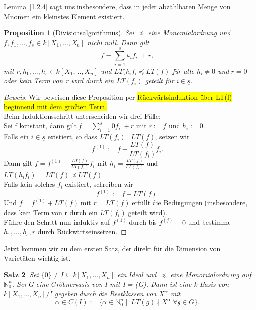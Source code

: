 \documentclass{article}
\newtheorem{satz}{Satz}
\newtheorem{proposition}[satz]{Proposition}
\newcommand*{\R}{k[X_{1},\ldots,X_{n}]}
\begin{document}
	Lemma~\ref{1.2.4} sagt uns insbesondere, dass in jeder abzählbaren Menge von Mnomen ein
	kleinstes Element existiert.
	

	\begin{proposition}[Divisionsalgorithmus] \label{1.2.5}
	Sei \(\preceq\) eine Monomialordnung und \(f, f_{1}, \ldots, f_{s} \in \R\) nicht null. Dann
	gilt \begin{displaymath} f = \sum_{i=1}^{s} h_{i}f_{i}\; + r, \end{displaymath} mit
	\(r, h_{1}, \ldots, h_{s} \in \R\) und \(LT(h_{i}f_{i} \preceq LT(f)\) für alle \(h_{i} \neq 0
	\) und \(r = 0\) oder kein Term von r wird durch ein \(LT(f_{i})\) geteilt für \(i \in
	\underline{s}\).
	\end{proposition}

	\begin{proof}[Beweis]
	Wir beweisen diese Proposition per \colorbox{yellow}{Rückwärtsinduktion über LT(f) beginnend mit dem größten Term.} \\
	Beim Induktionsschritt unterscheiden wir drei Fälle:\\
	Sei f konstant, dann gilt \(f = \sum_{i=1}^{s} 0f_{i}\; + r\) mit \(r := f\) und \(h_{i} := 0\). \\
	Falls ein \(i \in \underline{s}\) existiert, so dass \(LT(f_{i})\;| \; LT(f)\), setzen wir
	\begin{displaymath} f^{(1)} := f - \frac{LT(f)}{LT(f_{i})}f_{i}.\end{displaymath} Dann gilt
	\( f = f^{(1)} + \frac{LT(f)}{LT(f_{i})}f_{i} \) mit \(h_{i} = \frac{LT(f)}{LT(f_{i})}\) und 
	\(LT(h_{i}f_{i}) = LT(f) \preceq LT(f).\) \\
	Falls kein solches \(f_{i}\) existiert, schreiben wir \begin{displaymath} f^{(1)} := f -
	LT(f). \end{displaymath} Und \(f = f^{(1)} + LT(f)\) mit \(r = LT(f)\) erfüllt die Bedingungen 
	(insbesondere, dass kein Term von r durch ein \(LT(f_{i})\) geteilt wird). \\
	Führe den Schritt nun induktiv auf \(f^{(1)}\) durch bis \(f^{(j)} = 0\) und bestimme
	\(h_{1}, \ldots, h_{s}, r\) durch Rückwärtseinsetzen.
	\end{proof}


	Jetzt kommen wir zu dem ersten Satz, der direkt für die Dimension von Varietäten wichtig ist.


	\begin{satz} \label{1.2.8}
	Sei \(\{0\} \neq I \subseteq \R\) ein Ideal und \(\preceq\) eine Monomialordnung auf
	\(\mathbb{N}^{n}_{0}\). Sei G eine Gröbnerbasis von I mit I = (G). Dann ist eine k-Basis von 
	\(\R/I\) gegeben durch die Restklassen von \(X^{\alpha}\) mit
	\begin{displaymath}
	\alpha \in C(I) := \{\alpha \in \mathbb{N}^{n}_{0}\; |\;\; LT(g) \nmid X^{\alpha}\; \forall g 
	\in G\}.
	\end{displaymath}
	\end{satz}
\end{document}
